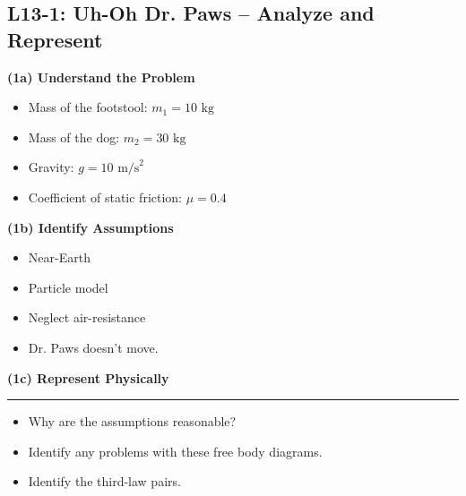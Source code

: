 \documentclass[]{article}
\newcommand{\Week}{13}
\begin{document}
\begin{PresentSpace}
\vspace{-10pt}
\section*{L\Week-1: Uh-Oh Dr. Paws -- Analyze and Represent}
\vspace{-20pt}
\begin{multicols}{2}
	\textbf{(1a) Understand the Problem}
	\begin{itemize}
		\large
		\item Mass of the footstool: $m_{1}=10\text{ kg}$
		\item Mass of the dog: $m_{2}=30\text{ kg}$
		\item Gravity: $g=10\text{ m/s}^{2}$
		\item Coefficient of static friction: $\mu=0.4$
	\end{itemize}
	\textbf{(1b) Identify Assumptions}
	\begin{itemize}
		\large
		\item Near-Earth
		\item Particle model
		\item Neglect air-resistance
		\item Dr. Paws doesn't move.
	\end{itemize}
	\textbf{(1c) Represent Physically}
	\begin{center}
	\end{center}
\end{multicols}
\hrule
\begin{itemize}
	\large
	\item Why are the assumptions reasonable?
	\item Identify any problems with these free body diagrams.
	\item Identify the third-law pairs.
\end{itemize}
\end{PresentSpace}
\end{document}
